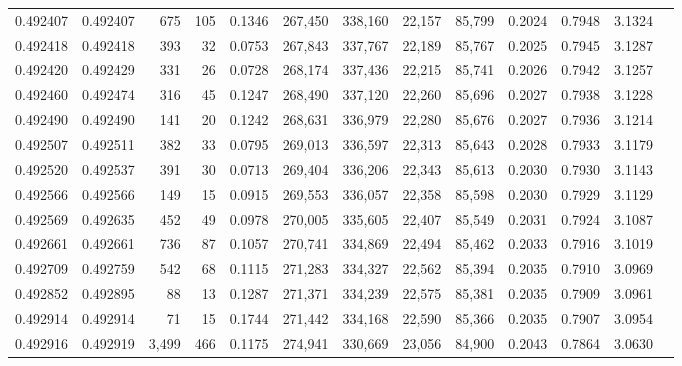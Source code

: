 \begin{tabular}{rrrrrrrrrrrrr}
0.492407 & 0.492407 &   675 &   105 &                                     0.1346 & 267,450 & 338,160 &  22,157 &  85,799 & 0.2024 & 0.7948 & 3.1324 \\
0.492418 & 0.492418 &   393 &    32 &                                     0.0753 & 267,843 & 337,767 &  22,189 &  85,767 & 0.2025 & 0.7945 & 3.1287 \\
0.492420 & 0.492429 &   331 &    26 &                                     0.0728 & 268,174 & 337,436 &  22,215 &  85,741 & 0.2026 & 0.7942 & 3.1257 \\
0.492460 & 0.492474 &   316 &    45 &                                     0.1247 & 268,490 & 337,120 &  22,260 &  85,696 & 0.2027 & 0.7938 & 3.1228 \\
0.492490 & 0.492490 &   141 &    20 &                                     0.1242 & 268,631 & 336,979 &  22,280 &  85,676 & 0.2027 & 0.7936 & 3.1214 \\
0.492507 & 0.492511 &   382 &    33 &                                     0.0795 & 269,013 & 336,597 &  22,313 &  85,643 & 0.2028 & 0.7933 & 3.1179 \\
0.492520 & 0.492537 &   391 &    30 &                                     0.0713 & 269,404 & 336,206 &  22,343 &  85,613 & 0.2030 & 0.7930 & 3.1143 \\
0.492566 & 0.492566 &   149 &    15 &                                     0.0915 & 269,553 & 336,057 &  22,358 &  85,598 & 0.2030 & 0.7929 & 3.1129 \\
0.492569 & 0.492635 &   452 &    49 &                                     0.0978 & 270,005 & 335,605 &  22,407 &  85,549 & 0.2031 & 0.7924 & 3.1087 \\
0.492661 & 0.492661 &   736 &    87 &                                     0.1057 & 270,741 & 334,869 &  22,494 &  85,462 & 0.2033 & 0.7916 & 3.1019 \\
0.492709 & 0.492759 &   542 &    68 &                                     0.1115 & 271,283 & 334,327 &  22,562 &  85,394 & 0.2035 & 0.7910 & 3.0969 \\
0.492852 & 0.492895 &    88 &    13 &                                     0.1287 & 271,371 & 334,239 &  22,575 &  85,381 & 0.2035 & 0.7909 & 3.0961 \\
0.492914 & 0.492914 &    71 &    15 &                                     0.1744 & 271,442 & 334,168 &  22,590 &  85,366 & 0.2035 & 0.7907 & 3.0954 \\
0.492916 & 0.492919 & 3,499 &   466 &                                     0.1175 & 274,941 & 330,669 &  23,056 &  84,900 & 0.2043 & 0.7864 & 3.0630 \\

\end{tabular}
